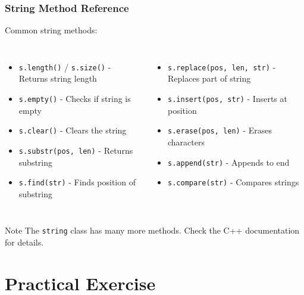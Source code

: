 \documentclass{beamer}
\begin{document}
\begin{frame}[fragile]
    \frametitle{String Method Reference}
    
    Common string methods:
    
    \begin{columns}
        \begin{itemize}
            \item \texttt{s.length()} / \texttt{s.size()} - Returns string length
            \item \texttt{s.empty()} - Checks if string is empty
            \item \texttt{s.clear()} - Clears the string
            \item \texttt{s.substr(pos, len)} - Returns substring
            \item \texttt{s.find(str)} - Finds position of substring
        \end{itemize}
        
        \begin{itemize}
            \item \texttt{s.replace(pos, len, str)} - Replaces part of string
            \item \texttt{s.insert(pos, str)} - Inserts at position
            \item \texttt{s.erase(pos, len)} - Erases characters
            \item \texttt{s.append(str)} - Appends to end
            \item \texttt{s.compare(str)} - Compares strings
        \end{itemize}
    \end{columns}
    
    \begin{alertblock}{Note}
        The \texttt{string} class has many more methods. Check the C++ documentation for details.
    \end{alertblock}
\end{frame}

\section{Practical Exercise}
\end{document}
